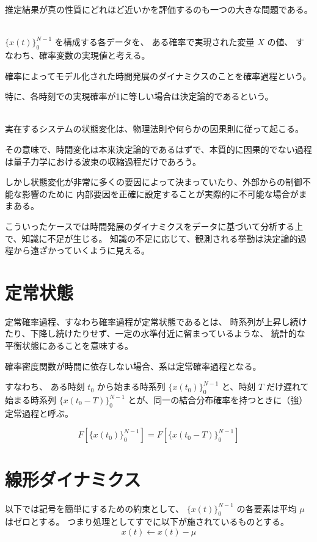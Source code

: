 \documentclass[uplatex,a4j,12pt,dvipdfmx]{jsarticle}
\begin{document}
推定結果が真の性質にどれほど近いかを評価するのも一つの大きな問題である。

\ \\

$\{ x(t) \}^{N-1}_{0}$ を構成する各データを、
ある確率で実現された変量 $X$ の値、
すなわち、確率変数の実現値と考える。

確率によってモデル化された時間発展のダイナミクスのことを確率過程という。

特に、各時刻での実現確率が1に等しい場合は決定論的であるという。

\ \\

実在するシステムの状態変化は、物理法則や何らかの因果則に従って起こる。

その意味で、時間変化は本来決定論的であるはずで、本質的に因果的でない過程は量子力学における波束の収縮過程だけであろう。

しかし状態変化が非常に多くの要因によって決まっていたり、外部からの制御不能な影響のために
内部要因を正確に設定することが実際的に不可能な場合がままある。

こういったケースでは時間発展のダイナミクスをデータに基づいて分析する上で、知識に不足が生じる。
知識の不足に応じて、観測される挙動は決定論的過程から遠ざかっていくように見える。



\section{定常状態}

定常確率過程、すなわち確率過程が定常状態であるとは、
時系列が上昇し続けたり、下降し続けたりせず、一定の水準付近に留まっているような、
統計的な平衡状態にあることを意味する。

確率密度関数が時間に依存しない場合、系は定常確率過程となる。

すなわち、
ある時刻 $t_{0}$ から始まる時系列
$\{ x(t_{0}) \}^{N-1}_{0}$
と、時刻 $T$ だけ遅れて始まる時系列
$\{ x(t_{0}-T) \}^{N-1}_{0}$
とが、同一の結合分布確率を持つときに（強）定常過程と呼ぶ。

\[
	F[ \{ x(t_{0}) \}^{N-1}_{0} ] = F[ \{ x(t_{0}-T) \}^{N-1}_{0} ]
\]


\section{線形ダイナミクス}

以下では記号を簡単にするための約束として、
$\{ x(t) \}^{N-1}_{0}$ の各要素は平均 $\mu$ はゼロとする。
つまり処理としてすでに以下が施されているものとする。
\[
	x(t) \leftarrow x(t) - \mu
\]
\end{document}
